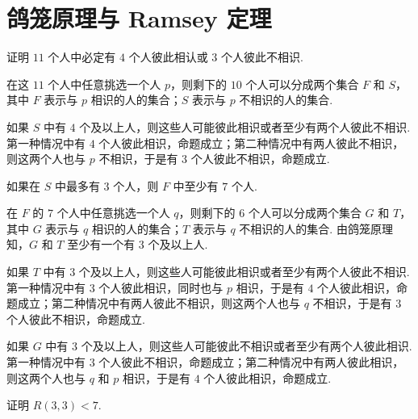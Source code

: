 \documentclass[cn, hazy, blue, normal, 12pt]{elegantnote}
\begin{document}
\section{鸽笼原理与 Ramsey 定理}

\begin{exercise}

    证明 $11$ 个人中必定有 $4$ 个人彼此相认或 $3$ 个人彼此不相识.

\end{exercise}

\begin{solution}[print=true]

    在这 $11$ 个人中任意挑选一个人 $p$，则剩下的 $10$ 个人可以分成两个集合 $F$ 和 $S$，其中 $F$ 表示与 $p$ 相识的人的集合；$S$ 表示与 $p$ 不相识的人的集合.

    如果 $S$ 中有 $4$ 个及以上人，则这些人可能彼此相识或者至少有两个人彼此不相识. 第一种情况中有 $4$ 个人彼此相识，命题成立；第二种情况中有两人彼此不相识，则这两个人也与 $p$ 不相识，于是有 $3$ 个人彼此不相识，命题成立.

    如果在 $S$ 中最多有 $3$ 个人，则 $F$ 中至少有 $7$ 个人.

    在 $F$ 的 $7$ 个人中任意挑选一个人 $q$，则剩下的 $6$ 个人可以分成两个集合 $G$ 和 $T$，其中 $G$ 表示与 $q$ 相识的人的集合；$T$ 表示与 $q$ 不相识的人的集合. 由鸽笼原理知，$G$ 和 $T$ 至少有一个有 $3$ 个及以上人.

    如果 $T$ 中有 $3$ 个及以上人，则这些人可能彼此相识或者至少有两个人彼此不相识. 第一种情况中有 $3$ 个人彼此相识，同时也与 $p$ 相识，于是有 $4$ 个人彼此相识，命题成立；第二种情况中有两人彼此不相识，则这两个人也与 $q$ 不相识，于是有 $3$ 个人彼此不相识，命题成立.

    如果 $G$ 中有 $3$ 个及以上人，则这些人可能彼此不相识或者至少有两个人彼此相识. 第一种情况中有 $3$ 个人彼此不相识，命题成立；第二种情况中有两人彼此相识，则这两个人也与 $q$ 和 $p$ 相识，于是有 $4$ 个人彼此相识，命题成立.

\end{solution}

\begin{exercise}

    证明 $R(3, 3) < 7$.

\end{exercise}
\end{document}
